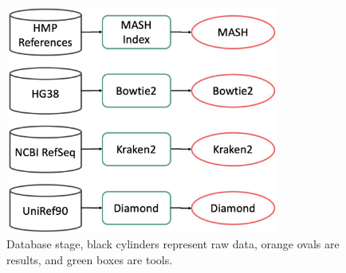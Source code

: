 \begin{figure}
  \begin{center}
    \includegraphics[width=0.8\textwidth]{figs/sfig_db.jpeg}
	\caption{\small{
	    Database stage, black cylinders represent raw data, orange ovals are results, and green boxes are tools.
	}}
    \label{fig:db}
  \end{center}
\end{figure}